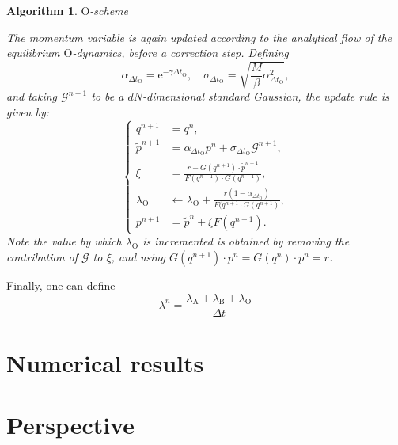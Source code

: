\documentclass[pdflatex,sn-mathphys]{sn-jnl}%
\theoremstyle{thmstyleone}%
\theoremstyle{thmstyletwo}%
\newtheorem{algorithm}{Algorithm}
\theoremstyle{thmstylethree}%
\newcommand{\1}{\mathbbm{1}}
\renewcommand{\e}{\mathrm{e}}
\begin{document}
\begin{algorithm}
\caption{$\mathrm{O}$-scheme}
The momentum variable is again updated according to the analytical flow of the equilibrium $\mathrm{O}$-dynamics, before a correction step. Defining
$$\alpha_{\Delta t_{\mathrm{O}}}=\e^{-\gamma \Delta t_{\mathrm{O}}},\quad\sigma_{\Delta t_{\mathrm{O}}}=\sqrt{\frac{M}{\beta}\alpha_{\Delta t_{\mathrm{O}}}^2},$$
and taking $\mathcal{G}^{n+1}$ to be a $dN$-dimensional standard Gaussian, the update rule is given by:
\begin{equation}
\left\{\begin{aligned}
    q^{n+1} &= q^n,\\
    \widetilde{p}^{n+1}&=\alpha_{\Delta t_{\mathrm{O}}}p^n +\sigma_{\Delta t_{\mathrm{O}}}\mathcal{G}^{n+1},\\
    \xi &= \frac{r-G(q^{n+1})\cdot \widetilde{p}^{n+1}}{F(q^{n+1})\cdot G(q^{n+1})},\\
    \lambda_{\mathrm{O}} &\gets \lambda_{\mathrm{O}} + \frac{r(1-\alpha_{\Delta t_{\mathrm{O}}})}{F(q^{n+1}\cdot G(q^{n+1})},\\
    p^{n+1} &= \widetilde{p}^n + \xi F(q^{n+1}).
\end{aligned}\right.
\end{equation}
Note the value by which $\lambda_{\mathrm{O}}$ is incremented is obtained by removing the contribution of $\mathcal G$ to $\xi$, and using $G(q^{n+1})\cdot p^{n} = G(q^n)\cdot p^n =r$.
\end{algorithm}

Finally, one can define
\begin{equation}
    \label{eq:lambda_numerical_estimation}
    \lambda^n=\frac{\lambda_{\mathrm{A}}+\lambda_{\mathrm{B}}+\lambda_{\mathrm{O}}}{\Delta t}
\end{equation}

\section{Numerical results}\label{num}
\section{Perspective}\label{pers}

\end{document}
